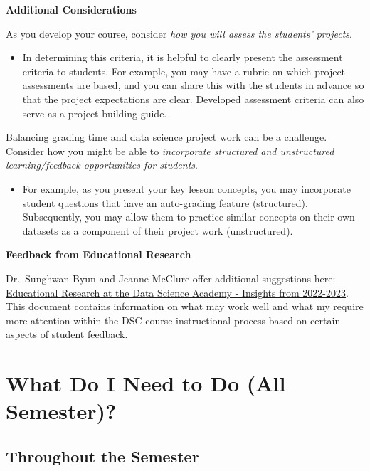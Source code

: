 \documentclass[
]{book}
\providecommand{\tightlist}{%
  \setlength{\itemsep}{0pt}\setlength{\parskip}{0pt}}
\begin{document}
\textbf{Additional Considerations}

As you develop your course, consider \emph{how you will assess the students' projects}.

\begin{itemize}
\tightlist
\item
  In determining this criteria, it is helpful to clearly present the assessment criteria to students. For example, you may have a rubric on which project assessments are based, and you can share this with the students in advance so that the project expectations are clear. Developed assessment criteria can also serve as a project building guide.
\end{itemize}

Balancing grading time and data science project work can be a challenge. Consider how you might be able to \emph{incorporate structured and unstructured learning/feedback opportunities for students}.

\begin{itemize}
\tightlist
\item
  For example, as you present your key lesson concepts, you may incorporate student questions that have an auto-grading feature (structured). Subsequently, you may allow them to practice similar concepts on their own datasets as a component of their project work (unstructured).
\end{itemize}

\textbf{Feedback from Educational Research}

Dr.~Sunghwan Byun and Jeanne McClure offer additional suggestions here: \href{https://docs.google.com/document/d/1jRILSc0DsFm2moet9Ep8bF1suEOfHfnLzfJ2t4tIfjA/edit?usp=sharing}{Educational Research at the Data Science Academy - Insights from 2022-2023}. This document contains information on what may work well and what my require more attention within the DSC course instructional process based on certain aspects of student feedback.

\hypertarget{what-do-i-need-to-do-all-semester}{%
\chapter{What Do I Need to Do (All Semester)?}\label{what-do-i-need-to-do-all-semester}}

\hypertarget{throughout-the-semester}{%
\section{Throughout the Semester}\label{throughout-the-semester}}
\end{document}
